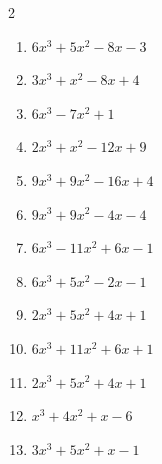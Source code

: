 \begin{multicols}{2}
\begin{enumerate}
\columnbreak %

  \item $6x^{3}+5x^{2}-8x-3$

        \phantom{$=(2x+3)(3x+1)(x-1)$}

  \item $3x^{3}+x^{2}-8x+4$

        \phantom{$=(3x-2)(x+2)(x-1)$}

  \item $6x^{3}-7x^{2}+1$

        \phantom{$=(2x-1)(3x+1)(x-1)$}

  \item $2x^{3}+x^{2}-12x+9$

        \phantom{$=(2x-3)(x+3)(x-1)$}

  \item $9x^{3}+9x^{2}-16x+4$

        \phantom{$=(3x-1)(3x-2)(x+2)$}

\columnbreak %

\resetques

  \item $9x^{3}+9x^{2}-4x-4$

        \phantom{$=(3x+2)(3x-2)(x+1)$}

  \item $6x^{3}-11x^{2}+6x-1$

        \phantom{$=(2x-1)(3x-1)(x-1)$}

  \item $6x^{3}+5x^{2}-2x-1$

        \phantom{$=(2x-1)(3x+1)(x+1)$}

  \item $2x^{3}+5x^{2}+4x+1$


  \item $6x^{3}+11x^{2}+6x+1$

        \phantom{$=(2x+1)(3x+1)(x+1)$}

\columnbreak %

  \item $2x^{3}+5x^{2}+4x+1$


  \item $x^{3}+4x^{2}+x-6$

        \phantom{$=(x+2)(x+3)(x-1)$}

  \item $3x^{3}+5x^{2}+x-1$


\end{enumerate}
\end{multicols}
